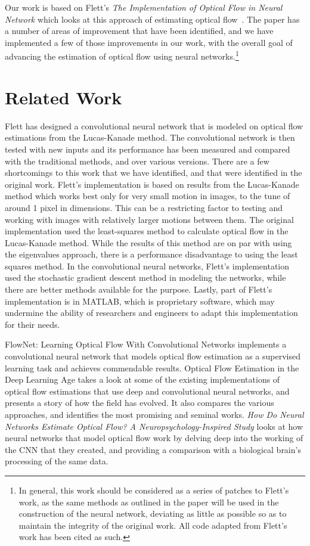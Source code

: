\documentclass[]{article}
\begin{document}
    Our work is based on Flett's \textit{The Implementation of Optical Flow in Neural Network} which looks at this approach of estimating optical flow~\cite{flett}.
    The paper has a number of areas of improvement that have been identified, and we have implemented a few of those improvements in our work, with the overall goal of advancing the estimation of optical flow using neural networks.\footnote{In general, this work should be considered as a series of patches to Flett's work, as the same methods as outlined in the paper will be used in the construction of the neural network, deviating as little as possible so as to maintain the integrity of the original work.
    All code adapted from Flett's work has been cited as such.}


    \section{Related Work}\label{sec:related-work}
    Flett has designed a convolutional neural network that is modeled on optical flow estimations from the Lucas-Kanade method.
    The convolutional network is then tested with new inputs and its performance has been measured and compared with the traditional methods, and over various versions.
    There are a few shortcomings to this work that we have identified, and that were identified in the original work.
    Flett's implementation is based on results from the Lucas-Kanade method which works best only for very small motion in images, to the tune of around 1 pixel in dimensions.
    This can be a restricting factor to testing and working with images with relatively larger motions between them.
    The original implementation used the least-squares method to calculate optical flow in the Lucas-Kanade method.
    While the results of this method are on par with using the eigenvalues approach, there is a performance disadvantage to using the least squares method.
    In the convolutional neural networks, Flett's implementation used the stochastic gradient descent method in modeling the networks, while there are better methods available for the purpose.
    Lastly, part of Flett's implementation is in MATLAB, which is proprietary software, which may undermine the ability of researchers and engineers to adapt this implementation for their needs.\cite{flett}

    FlowNet: Learning Optical Flow With Convolutional Networks\cite{fischer} implements a convolutional neural network that models optical flow estimation as a supervised learning task and achieves commendable results.
    Optical Flow Estimation in the Deep Learning Age\cite{roth} takes a look at some of the existing implementations of optical flow estimations that use deep and convolutional neural networks, and presents a story of how the field has evolved.
    It also compares the various approaches, and identifies the most promising and seminal works.
    \textit{How Do Neural Networks Estimate Optical Flow?
    A Neuropsychology-Inspired Study}\cite{jong} looks at how neural networks that model optical flow work by delving deep into the working of the CNN that they created, and providing a comparison with a biological brain's processing of the same data.
\end{document}
